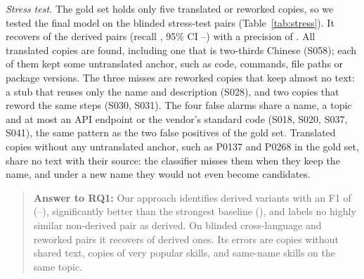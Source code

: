 \documentclass[sigconf,screen]{acmart}
\begin{document}
\emph{Stress test.} The gold set holds only five translated or reworked copies, so we tested the final model on the \ResSTPairs{} blinded stress-test pairs (Table~\ref{tab:stress}). It recovers \ResSTAllTP{} of the \ResSTAllDerived{} derived pairs (recall \ResSTAllRecall{}, 95\% CI \ResSTAllRecallLo--\ResSTAllRecallHi) with a precision of \ResSTAllPrecision{}. All \ResSTCrossDerived{} translated copies are found, including one that is two-thirds Chinese (S058); each of them kept some untranslated anchor, such as code, commands, file paths or package versions. The three misses are reworked copies that keep almost no text: a stub that reuses only the name and description (S028), and two copies that reword the same steps (S030, S031). The four false alarms share a name, a topic and at most an API endpoint or the vendor's standard code (S018, S020, S037, S041), the same pattern as the two false positives of the gold set. Translated copies without any untranslated anchor, such as P0137 and P0268 in the gold set, share no text with their source: the classifier misses them when they keep the name, and under a new name they would not even become candidates.

\begin{table}[t]
\caption{Stress test on blinded same-name pairs (recall with 95\% Wilson interval).}
\label{tab:stress}
\small
{}
\end{table}
 
\begin{quote}
\textbf{Answer to RQ1:} Our approach identifies derived variants with an F1 of \ResOursF{} (\ResOursFLo--\ResOursFHi), significantly better than the strongest baseline (\ResBaseF{}), and labels no highly similar non-derived pair as derived. On blinded cross-language and reworked pairs it recovers \ResSTAllTP{} of \ResSTAllDerived{} derived ones. Its errors are copies without shared text, copies of very popular skills, and same-name skills on the same topic.
\end{quote}
\end{document}
